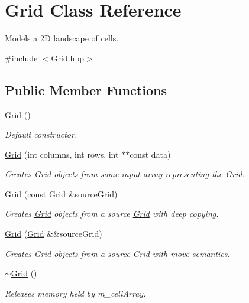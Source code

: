 \hypertarget{class_grid}{}\section{Grid Class Reference}
\label{class_grid}


Models a 2D landscape of cells.  




{\ttfamily \#include $<$Grid.\+hpp$>$}

\subsection*{Public Member Functions}
\begin{DoxyCompactItemize}
\item 
\hyperlink{class_grid_a4ac9ff4f63552b4c61ff90fcb35ad66c}{Grid} ()
\begin{DoxyCompactList}\small\item\em Default constructor. \end{DoxyCompactList}\item 
\hyperlink{class_grid_ab64f5607521a89e7a2fb99cbfa5f2b44}{Grid} (int columns, int rows, int $\ast$$\ast$const data)
\begin{DoxyCompactList}\small\item\em Creates \hyperlink{class_grid}{Grid} objects from some input array representing the \hyperlink{class_grid}{Grid}. \end{DoxyCompactList}\item 
\hyperlink{class_grid_a2be5432331273bc420c252ea09631965}{Grid} (const \hyperlink{class_grid}{Grid} \&source\+Grid)
\begin{DoxyCompactList}\small\item\em Creates \hyperlink{class_grid}{Grid} objects from a source \hyperlink{class_grid}{Grid} with deep copying. \end{DoxyCompactList}\item 
\hyperlink{class_grid_a3828d0bf34f6c97ed93adc84d4ce6c4b}{Grid} (\hyperlink{class_grid}{Grid} \&\&source\+Grid)
\begin{DoxyCompactList}\small\item\em Creates \hyperlink{class_grid}{Grid} objects from a source \hyperlink{class_grid}{Grid} with move semantics. \end{DoxyCompactList}\item 
\hyperlink{class_grid_a3661d0a7f998caaaf8627d7a67072116}{$\sim$\+Grid} ()
\begin{DoxyCompactList}\small\item\em Releases memory held by m\+\_\+cell\+Array. \end{DoxyCompactList}\item 
$$
\end{DoxyCompactItemize}

